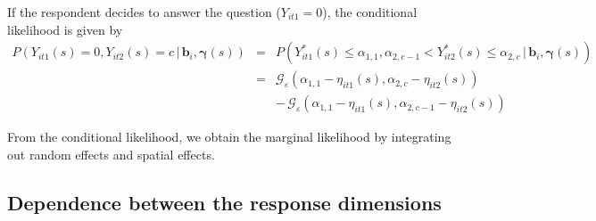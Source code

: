 \documentclass[submit]{smj}
\begin{document}
If the respondent decides to answer the question ($Y_{it1}=0$), the conditional likelihood is given by
   \begin{eqnarray*}
    P(Y_{it1}(s) =0, Y_{it2}(s)=c\,|\,\pmb{b}_i,\pmb{\gamma}(s)) &=& P(Y_{it1}^*(s)\le\alpha_{1,1}, \alpha_{2,c-1}< Y_{it2}^*(s)\le\alpha_{2,c}\,|\,\pmb{b}_i,\pmb{\gamma}(s))\\
  &=&\mathcal{G}_\varepsilon(\alpha_{1,1}-\eta_{it1}(s), \alpha_{2,c}-\eta_{it2}(s))\\
  && -\, \mathcal{G}_\varepsilon(\alpha_{1,1}-\eta_{it1}(s),\alpha_{2,c-1}-\eta_{it2}(s))
\end{eqnarray*}

From the conditional likelihood, we obtain the marginal likelihood by integrating out random effects and spatial effects. %

\subsection{Dependence between the response dimensions}\label{subsec:depend}
\end{document}
